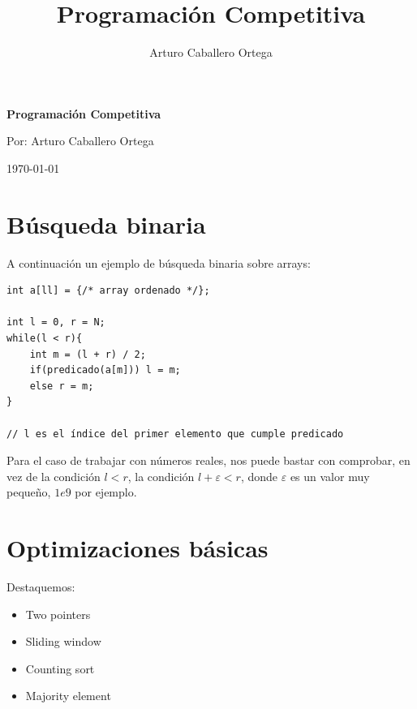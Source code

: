 \documentclass[11 pt]{article}
\title{Programación Competitiva}
\author{Arturo Caballero Ortega}
\begin{document}
\begin{titlepage}

    \centering
    \vspace*{\fill}
    {\Huge \textbf{Programación Competitiva} \par}
    \vspace*{\fill}

    {\Large Por: Arturo Caballero Ortega\par}
    \vspace{1cm}
    {\Large \today\par}
    \vspace{2cm}

\end{titlepage}

\tableofcontents
\newpage

\section{Búsqueda binaria}


A continuación un ejemplo de búsqueda binaria sobre arrays:


\begin{verbatim}
int a[ll] = {/* array ordenado */};

int l = 0, r = N;
while(l < r){
    int m = (l + r) / 2;
    if(predicado(a[m])) l = m;
    else r = m;
}

// l es el índice del primer elemento que cumple predicado
\end{verbatim}

Para el caso de trabajar con números reales, nos puede bastar con comprobar, en vez de la condición
$l<r$, la condición $l + \varepsilon < r$, donde $\varepsilon$ es un valor muy pequeño, $1e9$ por ejemplo.

\vspace{25 px}
\section{Optimizaciones básicas}

    
Destaquemos:
\begin{itemize}
    \item Two pointers
    \item Sliding window
    \item Counting sort
    \item Majority element
\end{itemize}
\end{document}
